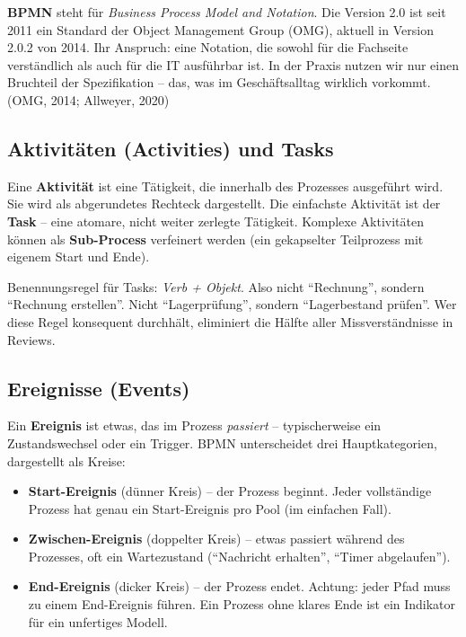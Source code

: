 \documentclass[11pt,a4paper,oneside]{article}
\newcommand{\fachbegriff}[1]{\textbf{#1}}
\newcommand{\quelle}[1]{{\footnotesize\color{lpGray}(#1)}}
\begin{document}
\fachbegriff{BPMN} steht für \emph{Business Process Model and Notation}. Die Version 2.0 ist seit 2011 ein Standard der Object Management Group (OMG), aktuell in Version 2.0.2 von 2014. Ihr Anspruch: eine Notation, die sowohl für die Fachseite verständlich als auch für die IT ausführbar ist. In der Praxis nutzen wir nur einen Bruchteil der Spezifikation -- das, was im Geschäftsalltag wirklich vorkommt. \quelle{OMG, 2014; Allweyer, 2020}

\subsection{Aktivitäten (Activities) und Tasks}

Eine \fachbegriff{Aktivität} ist eine Tätigkeit, die innerhalb des Prozesses ausgeführt wird. Sie wird als abgerundetes Rechteck dargestellt. Die einfachste Aktivität ist der \fachbegriff{Task} -- eine atomare, nicht weiter zerlegte Tätigkeit. Komplexe Aktivitäten können als \fachbegriff{Sub-Process} verfeinert werden (ein gekapselter Teilprozess mit eigenem Start und Ende).

Benennungsregel für Tasks: \emph{Verb + Objekt}. Also nicht ``Rechnung'', sondern ``Rechnung erstellen''. Nicht ``Lagerprüfung'', sondern ``Lagerbestand prüfen''. Wer diese Regel konsequent durchhält, eliminiert die Hälfte aller Missverständnisse in Reviews.

\subsection{Ereignisse (Events)}

Ein \fachbegriff{Ereignis} ist etwas, das im Prozess \emph{passiert} -- typischerweise ein Zustandswechsel oder ein Trigger. BPMN unterscheidet drei Hauptkategorien, dargestellt als Kreise:

\begin{itemize}
  \item \fachbegriff{Start-Ereignis} (dünner Kreis) -- der Prozess beginnt. Jeder vollständige Prozess hat genau ein Start-Ereignis pro Pool (im einfachen Fall).
  \item \fachbegriff{Zwischen-Ereignis} (doppelter Kreis) -- etwas passiert während des Prozesses, oft ein Wartezustand (``Nachricht erhalten'', ``Timer abgelaufen'').
  \item \fachbegriff{End-Ereignis} (dicker Kreis) -- der Prozess endet. Achtung: jeder Pfad muss zu einem End-Ereignis führen. Ein Prozess ohne klares Ende ist ein Indikator für ein unfertiges Modell.
\end{itemize}
\end{document}
